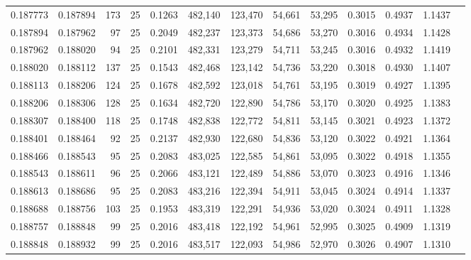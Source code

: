\begin{tabular}{rrrrrrrrrrrrr}
0.187773 & 0.187894 &   173 &  25 &                                     0.1263 & 482,140 & 123,470 &  54,661 &  53,295 & 0.3015 & 0.4937 & 1.1437 \\
0.187894 & 0.187962 &    97 &  25 &                                     0.2049 & 482,237 & 123,373 &  54,686 &  53,270 & 0.3016 & 0.4934 & 1.1428 \\
0.187962 & 0.188020 &    94 &  25 &                                     0.2101 & 482,331 & 123,279 &  54,711 &  53,245 & 0.3016 & 0.4932 & 1.1419 \\
0.188020 & 0.188112 &   137 &  25 &                                     0.1543 & 482,468 & 123,142 &  54,736 &  53,220 & 0.3018 & 0.4930 & 1.1407 \\
0.188113 & 0.188206 &   124 &  25 &                                     0.1678 & 482,592 & 123,018 &  54,761 &  53,195 & 0.3019 & 0.4927 & 1.1395 \\
0.188206 & 0.188306 &   128 &  25 &                                     0.1634 & 482,720 & 122,890 &  54,786 &  53,170 & 0.3020 & 0.4925 & 1.1383 \\
0.188307 & 0.188400 &   118 &  25 &                                     0.1748 & 482,838 & 122,772 &  54,811 &  53,145 & 0.3021 & 0.4923 & 1.1372 \\
0.188401 & 0.188464 &    92 &  25 &                                     0.2137 & 482,930 & 122,680 &  54,836 &  53,120 & 0.3022 & 0.4921 & 1.1364 \\
0.188466 & 0.188543 &    95 &  25 &                                     0.2083 & 483,025 & 122,585 &  54,861 &  53,095 & 0.3022 & 0.4918 & 1.1355 \\
0.188543 & 0.188611 &    96 &  25 &                                     0.2066 & 483,121 & 122,489 &  54,886 &  53,070 & 0.3023 & 0.4916 & 1.1346 \\
0.188613 & 0.188686 &    95 &  25 &                                     0.2083 & 483,216 & 122,394 &  54,911 &  53,045 & 0.3024 & 0.4914 & 1.1337 \\
0.188688 & 0.188756 &   103 &  25 &                                     0.1953 & 483,319 & 122,291 &  54,936 &  53,020 & 0.3024 & 0.4911 & 1.1328 \\
0.188757 & 0.188848 &    99 &  25 &                                     0.2016 & 483,418 & 122,192 &  54,961 &  52,995 & 0.3025 & 0.4909 & 1.1319 \\
0.188848 & 0.188932 &    99 &  25 &                                     0.2016 & 483,517 & 122,093 &  54,986 &  52,970 & 0.3026 & 0.4907 & 1.1310 \\

\end{tabular}
